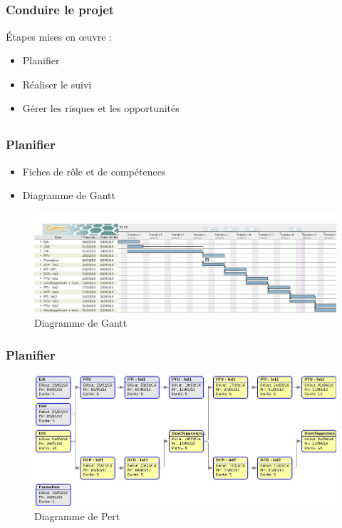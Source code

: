 \speaker{\Sergi{}}
\subsection{} %

\begin{frame}
\frametitle{Conduire le projet}
Étapes mises en \oe{}uvre :
	\begin{itemize}
		\item Planifier
		\item Réaliser le suivi
		\item Gérer les risques et les opportunités
	\end{itemize}
\end{frame}

\subsection{}

\begin{frame}
\frametitle{Planifier}
\begin{itemize}
	\item Fiches de rôle et de compétences
	\item Diagramme de Gantt
\end{itemize}
\begin{figure}
\begin{center}
	\includegraphics[scale=0.25]{images/exempleGantt.jpg}
	\caption{Diagramme de Gantt}
	\label{DG}
\end{center}
\end{figure}
\end{frame}

\begin{frame}
\frametitle{Planifier}
\begin{figure}
\includegraphics[scale=0.3]{images/exemplePert.jpg}
\caption{Diagramme de Pert}
\label{DP}
\end{figure}
\end{frame}

